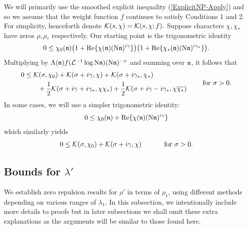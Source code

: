 \documentclass[12pt,psamsfonts]{amsart}
\theoremstyle{definition}
\theoremstyle{remark}
\numberwithin{equation}{section}
\begin{document}
We will primarily use the smoothed explicit inequality (\cref{ExplicitNP-Apply}) and so we assume that the weight function $f$ continues to satisfy Conditions 1 and 2. For simplicity, henceforth denote $\mathcal{K}(s, \chi) = \mathcal{K}(s, \chi; f).$ Suppose characters $\chi, \chi_*$ have zeros $\rho, \rho_*$ respectively. Our starting point is the trigonometric identity
\[
0 \leq \chi_0(\mathfrak{n})\big( 1 + \mathrm{Re}\{ \chi(\mathfrak{n}) (\mathrm{N}\mathfrak{n})^{i\gamma} \} \big) \big( 1 + \mathrm{Re}\{ \chi_*(\mathfrak{n}) (\mathrm{N}\mathfrak{n})^{i\gamma_*} \} \big).
\]
Multiplying by $\Lambda(\mathfrak{n}) f( \mathcal{L}^{-1}\log\mathrm{N}\mathfrak{n}) (\mathrm{N}\mathfrak{n})^{-\sigma}$ and summing over $\mathfrak{n}$, it follows that
\begin{equation}
\begin{aligned}
0 & \leq \mathcal{K}(\sigma, \chi_0)  + \mathcal{K}(\sigma+i\gamma, \chi) + \mathcal{K}(\sigma+i\gamma_*, \chi_*)  \\
& \qquad + \frac{1}{2} \mathcal{K}(\sigma+i\gamma + i\gamma_*, \chi \chi_*)+ \frac{1}{2} \mathcal{K}(\sigma+i\gamma - i\gamma_*, \chi \overline{\chi_*})
\end{aligned} \qquad \text{ for } \sigma  > 0.
\label{TrigIdentity}
\end{equation}
 In some cases, we will use a simpler trigonometric identity:
 \[
0 \leq  \chi_0(\mathfrak{n}) + \mathrm{Re}\{ \chi(\mathfrak{n}) (\mathrm{N}\mathfrak{n})^{i\gamma} \} 
 \]
which similarly yields
\begin{equation}
\begin{aligned}
0 & \leq \mathcal{K}(\sigma, \chi_0)  + \mathcal{K}(\sigma+i\gamma, \chi) 
\end{aligned} \qquad \text{ for } \sigma  > 0.
\label{TrigIdentity-0}
\end{equation}
\subsection{Bounds for $\lambda'$}
\label{SZ-BoundsLp}

We establish zero repulsion results for $\rho'$ in terms of $\rho_1$, using different methods depending on various ranges of $\lambda_1$.  In this subsection, we intentionally include more details to proofs but in later subsections we shall omit these extra explanations as the arguments will be similar to those found here. 
\end{document}
